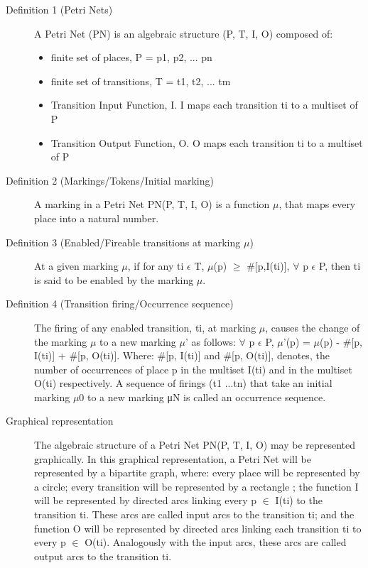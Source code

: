 \begin{description}
    \item[Definition 1 (Petri Nets)]
    A Petri Net (PN) is an algebraic structure (P, T, I, O) composed of:
        \begin{itemize}
            \item finite set of places, P = {p1, p2, ... pn}
            \item finite set of transitions, T = {t1, t2, ... tm}
            \item Transition Input Function, I. I maps each transition ti to
            a multiset of P
            \item Transition Output Function, O. O maps each transition ti
            to a multiset of P
        \end{itemize}
    \item[Definition 2 (Markings/Tokens/Initial marking)]
    A marking in a Petri Net PN(P, T, I, O) is a function $\mu$, that maps every place into a natural number.
    \item[Definition 3 (Enabled/Fireable transitions at marking $\mu$)]
    At a given marking $\mu$, if for any ti $\epsilon$ T, $\mu$(p) $\ge$ \#[p,I(ti)], $\forall$ p $\epsilon$ P, then ti is said to be enabled by the marking $\mu$.
    \item[Definition 4 (Transition firing/Occurrence sequence)] The firing of any enabled transition, ti, at marking $\mu$, causes the change of the marking $\mu$ to a new marking $\mu$' as follows: $\forall$ p $\epsilon$ P, $\mu$'(p) = $\mu$(p) - \#[p, I(ti)] + \#[p, O(ti)]. Where: \#[p, I(ti)] and \#[p, O(ti)], denotes, the number of occurrences of place p in the multiset I(ti) and in the multiset O(ti) respectively. A sequence of firings (t1 ...tn) that take an initial marking $\mu$0 to a new marking μN is called an occurrence sequence.
    \item[Graphical representation] The algebraic structure of a Petri Net PN(P, T, I, O) may be represented graphically. In this graphical representation, a Petri Net will be represented by a bipartite graph, where: every place will be represented by a circle; every transition will be represented by a rectangle ; the function I will be represented by directed arcs linking every p $\in$ I(ti) to the transition ti. These arcs are called input arcs to the transition ti; and the function O will be represented by directed arcs linking each transition ti to every p $\in$ O(ti). Analogously with the input arcs, these arcs are called output arcs to the transition ti.
\end{description}

